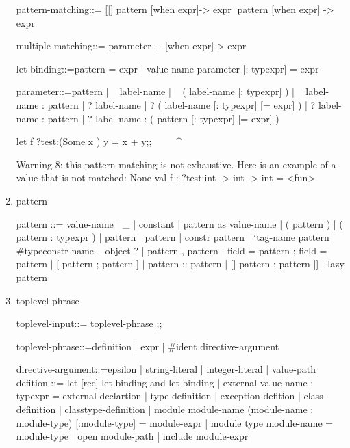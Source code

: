 \begin{enumerate}
\begin{bluecode}
pattern-matching::=
 [|] pattern [when expr]-> expr { |pattern  [when expr] ->  expr }  
 
multiple-matching::= { parameter }+  [when expr]-> expr  
 
let-binding::=pattern =  expr  
 	| value-name  { parameter }  [: typexpr] =  expr  
 
parameter::=pattern  
 	| ~ label-name  
 	| ~ ( label-name  [: typexpr] )  
 	| ~ label-name :  pattern  
 	| ? label-name  
 	| ? ( label-name  [: typexpr]  [= expr] )  
 	| ? label-name :  pattern  
 	| ? label-name : (  pattern  [: typexpr]  [= expr] )
\end{bluecode}        
      
\begin{alternate}
  let f ?test:(Some x ) y = x + y;;
  ^^^^^^^^^^^^^^^^^^^^^^^^^
\end{alternate}

\begin{bluecode}
Warning 8: this pattern-matching is not exhaustive.
Here is an example of a value that is not matched:
None
val f : ?test:int -> int -> int = <fun>
\end{bluecode}

  \item pattern

\begin{bluecode}
pattern	::=	value-name  
 	| _  
 	| constant  
 	| pattern as  value-name  
 	| ( pattern )  
 	| ( pattern :  typexpr )  
 	| pattern |  pattern  
 	| constr  pattern  
 	| `tag-name  pattern  
 	| #typeconstr-name  -- object ?
 	| pattern  { , pattern }  
 	| { field =  pattern  { ; field =  pattern } }  
 	| [ pattern  { ; pattern } ]  
 	| pattern ::  pattern  
 	| [| pattern  { ; pattern } |]  
 	| lazy pattern
\end{bluecode}

  \item toplevel-phrase

\begin{bluecode}
toplevel-input::= { toplevel-phrase } ;;  
 
toplevel-phrase::=definition  
 	| expr  
 	| #ident  directive-argument  
 
directive-argument::=epsilon
 	| string-literal  
 	| integer-literal  
 	| value-path
defition ::= let [rec] let-binding {and let-binding}
        | external value-name : typexpr = external-declartion
        | type-definition
        | exception-defition
        | class-definition
        | classtype-definition
        | module module-name {(module-name : module-type)} [:module-type] = module-expr
        | module type module-name = module-type
        | open module-path
        | include module-expr 
\end{bluecode}


\end{enumerate}

